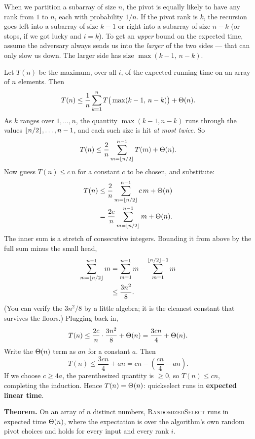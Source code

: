 When we partition a subarray of size $n$, the pivot is equally likely to have any
rank from $1$ to $n$, each with probability $1/n$. If the pivot rank is $k$, the
recursion goes left into a subarray of size $k-1$ or right into a subarray of size
$n-k$ (or stops, if we got lucky and $i = k$). To get an \emph{upper} bound on the
expected time, assume the adversary always sends us into the \emph{larger} of the
two sides --- that can only slow us down. The larger side has size
$\max(k-1,\,n-k)$.

Let $T(n)$ be the maximum, over all $i$, of the expected running time on an array
of $n$ elements. Then
\[
T(n) \le \frac{1}{n}\sum_{k=1}^{n} T\big(\max(k-1,\,n-k)\big) + \Theta(n).
\]
As $k$ ranges over $1,\dots,n$, the quantity $\max(k-1, n-k)$ runs through the
values $\lfloor n/2\rfloor, \dots, n-1$, and each such size is hit \emph{at most twice}.
So
\[
T(n) \le \frac{2}{n}\sum_{m = \lfloor n/2\rfloor}^{n-1} T(m) + \Theta(n).
\]
Now guess $T(n) \le c\,n$ for a constant $c$ to be chosen, and substitute:
\begin{align*}
  T(n) &\le \frac{2}{n}\sum_{m=\lfloor n/2\rfloor}^{n-1} c\,m + \Theta(n) \\
       &= \frac{2c}{n}\sum_{m=\lfloor n/2\rfloor}^{n-1} m + \Theta(n).
\end{align*}
The inner sum is a stretch of consecutive integers. Bounding it from above by the
full sum minus the small head,
\begin{align*}
  \sum_{m=\lfloor n/2\rfloor}^{n-1} m &= \sum_{m=1}^{n-1} m - \sum_{m=1}^{\lfloor n/2\rfloor-1} m \\
  &\le \frac{3n^2}{8}.
\end{align*}
(You can verify the $3n^2/8$ by a little algebra; it is the cleanest constant that
survives the floors.) Plugging back in,
\[
T(n) \le \frac{2c}{n}\cdot\frac{3n^2}{8} + \Theta(n) = \frac{3cn}{4} + \Theta(n).
\]
Write the $\Theta(n)$ term as $a n$ for a constant $a$. Then
\[
T(n) \le \frac{3cn}{4} + a n = c n - \left(\frac{cn}{4} - a n\right).
\]
If we choose $c \ge 4a$, the parenthesized quantity is $\ge 0$, so
$T(n) \le cn$, completing the induction. Hence $T(n) = \Theta(n)$: quickselect runs in
\textbf{expected linear time}.

\begin{formalbox}
\textbf{Theorem.} On an array of $n$ distinct numbers, \textsc{RandomizedSelect}
runs in expected time $\Theta(n)$, where the expectation is over the algorithm's own
random pivot choices and holds for every input and every rank $i$.
\end{formalbox}

